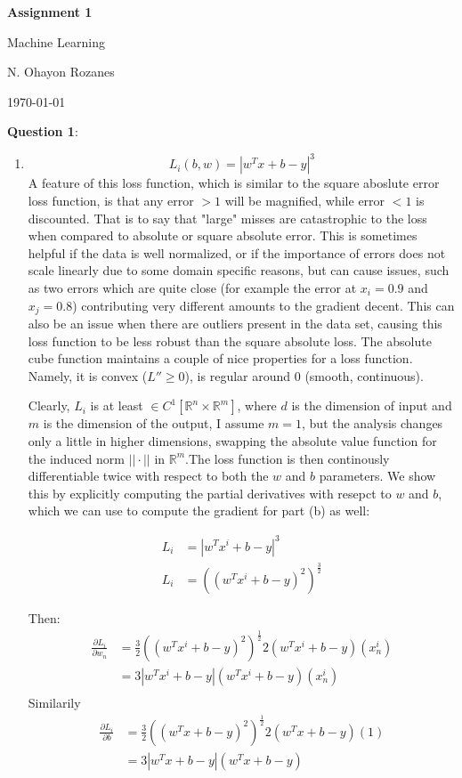 \documentclass{article} %
\newcommand{\question}[2][]{
  \begin{flushleft}
    \textbf{Question #1}: \textit{#2}

\end{flushleft}}
\newcommand{\maketitletwo}[2][]{
  \begin{center}
    \Large{\textbf{Assignment #1}

    Machine Learning} %
    \vspace{5pt}

    \normalsize{N. Ohayon Rozanes  %

    \today}        %
    \vspace{15pt}

\end{center}}
\begin{document}
\maketitletwo[1]{}
\question[1]{ }
\begin{enumerate}
  \item
    $$
    L_i(b, w) = |w^Tx + b - y|^3
    $$
    A feature of this loss function, which is similar to the square
    aboslute error loss function, is that any error $> 1$ will be
    magnified, while error $< 1$ is discounted. That is to say that
    "large" misses are catastrophic to the loss when compared to
    absolute or square absolute error. This is sometimes helpful if
    the data is well normalized, or if the importance of errors does
    not scale linearly due to some domain specific reasons, but can
    cause issues, such as two errors which are quite close (for
    example the error at $x_i = 0.9$ and $x_j = 0.8$) contributing
    very different amounts to the gradient decent. This can also be
    an issue when there are outliers present in the data set, causing
    this loss function to be less robust than the square absolute
    loss. The absolute cube function maintains a couple of nice
    properties for a loss function. Namely, it is convex ($L'' \ge
    0$), is regular around $0$ (smooth, continuous).

    Clearly, $L_i$ is at least $\in C^1[\mathbb{R}^n \times
    \mathbb{R}^m]$, where $d$ is the dimension of input and $m$ is
    the dimension of the output, I assume $m = 1$, but the analysis
    changes only a little in higher dimensions, swapping the absolute
    value function for the induced norm $|| \cdot ||$ in
    $\mathbb{R}^m$.The loss function is then continously
    differentiable twice with respect to both the $w$ and $b$
    parameters. We show this by explicitly computing the partial
    derivatives with resepct to $w$ and $b$, which we can use to
    compute the gradient for part (b) as well:

    \begin{align*}
      L_i &= |w^Tx^i + b - y|^3 \\
      L_i &= \left((w^Tx^i + b - y)^2\right)^\frac{3}{2}
    \end{align*}

    Then:
    \begin{align*}
      \frac{\partial L_i}{\partial w_n} &= \frac{3}{2}\left((w^Tx^i +
      b - y)^2\right)^\frac{1}{2}2(w^Tx^i+b-y)(x^i_n)\\
      &= 3|w^Tx^i+b-y|(w^Tx^i+b-y)(x^i_n) \\
    \end{align*}
    Similarily
    \begin{align*}
      \frac{\partial L_i}{\partial b} &= \frac{3}{2}\left((w^Tx + b -
      y)^2\right)^\frac{1}{2}2(w^Tx+b-y)(1)\\
      &= 3|w^Tx+b-y|(w^Tx+b-y)\\
    \end{align*}


\end{enumerate}
\end{document}
